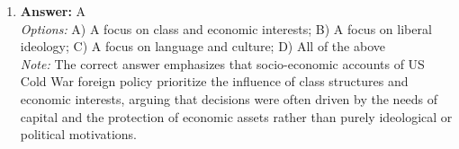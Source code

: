 \documentclass[12pt]{article}
\begin{document}
\begin{enumerate}[label=\arabic*.]
\\ \textit{Note:} The Liberal approach to US foreign policy emphasizes the promotion of democracy, free trade, and the establishment of international institutions as essential means to foster global cooperation, stability, and peace, reflecting the belief that these elements can lead to a more interconnected and prosperous world.
\item \textbf{Answer:} A
\\ \textit{Options:} A) A focus on class and economic interests; B) A focus on liberal ideology; C) A focus on language and culture; D) All of the above
\\ \textit{Note:} The correct answer emphasizes that socio-economic accounts of US Cold War foreign policy prioritize the influence of class structures and economic interests, arguing that decisions were often driven by the needs of capital and the protection of economic assets rather than purely ideological or political motivations.
\end{enumerate}
\end{document}

